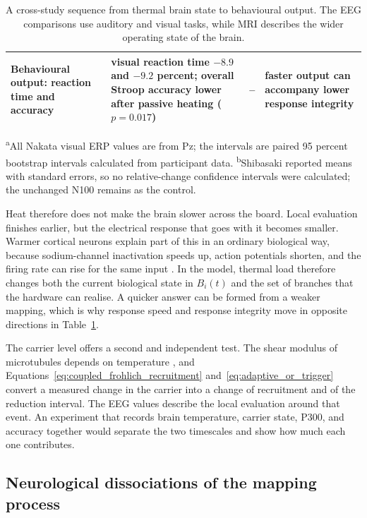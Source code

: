 \begin{table}[t]
\begin{tabular}{@{}
>{\raggedright\arraybackslash}p{2.8cm}
>{\raggedright\arraybackslash}p{3.35cm}
>{\raggedright\arraybackslash}p{3.9cm}
>{\raggedright\arraybackslash}p{3.2cm}@{}}
Behavioural output: reaction time and accuracy
& visual reaction time $-8.9$ and $-9.2$ percent; overall Stroop accuracy lower after passive heating ($p=0.017$)
& --
& faster output can accompany lower response integrity \citep{nakata2021heat,tan2024heat} \\
\bottomrule
\end{tabular}
\caption{A cross-study sequence from thermal brain state to behavioural output. The
EEG comparisons use auditory and visual tasks, while MRI describes the wider
operating state of the brain.}
\label{tab:thermal_processing_chain}
\vspace{2pt}
\parbox{\textwidth}{\scriptsize \textsuperscript{a}All Nakata visual ERP values are
from Pz; the intervals are paired 95 percent bootstrap intervals calculated from
participant data. \textsuperscript{b}Shibasaki reported means with standard errors,
so no relative-change confidence intervals were calculated; the unchanged N100
remains as the control.}
\end{table}

Heat therefore does not make the brain slower across the board. Local evaluation
finishes earlier, but the electrical response that goes with it becomes smaller. Warmer cortical neurons explain part of this in an ordinary biological way,
because sodium-channel inactivation speeds up, action potentials shorten, and the
firing rate can rise for the same input \citep{yu2012warm}. In the model, thermal
load therefore changes both the current biological state in $B_i(t)$ and the set of
branches that the hardware can realise. A quicker answer can be formed from a weaker
mapping, which is why response speed and response integrity move in opposite
directions in Table~\ref{tab:thermal_processing_chain}.

The carrier level offers a second and independent test.
The shear modulus of microtubules depends on temperature \citep{kis2008}, and
Equations~\eqref{eq:coupled_frohlich_recruitment}
and~\eqref{eq:adaptive_or_trigger} convert a measured change in the carrier into a
change of recruitment and of the reduction interval. The EEG values describe the
local evaluation around that event. An experiment that records brain temperature,
carrier state, P300, and accuracy together would separate the two timescales and
show how much each one contributes.

\subsection{Neurological dissociations of the mapping process}

